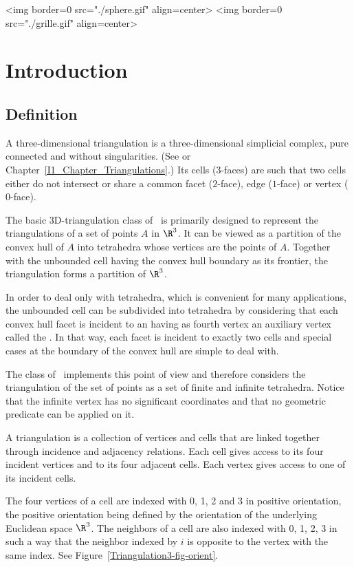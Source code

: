 \begin{ccHtmlOnly}
<img border=0 src="./sphere.gif" align=center>
<img border=0 src="./grille.gif" align=center>
\end{ccHtmlOnly}
\section{Introduction}
\label{Triangulation3-sec-intro}
\subsection{Definition}
\label{Triangulation3-sec-def}
A three-dimensional triangulation is a three-dimensional simplicial
complex, pure connected and without singularities. (See
\cite{by-ag-98} or Chapter~\ref{I1_Chapter_Triangulations}.) Its
cells ($3$-faces) are such that two cells either do not intersect or
share a common facet ($2$-face), edge ($1$-face) or vertex ($0$-face).

The basic 3D-triangulation class of \cgal\ is primarily designed to
represent the triangulations of a set of points $A$ in $\R^3$.  It can
be viewed as a partition of the convex hull of {$A$} into tetrahedra
whose vertices are the points of {$A$}.  Together with the unbounded
cell having the convex hull boundary as its frontier, the triangulation
forms a partition of $\R^3$.

In order to deal
only with tetrahedra, which is convenient for many applications, the
unbounded cell can be subdivided into tetrahedra by considering that
each convex hull facet is incident to an  having as
fourth vertex an auxiliary vertex called the .  In
that way, each facet is incident to exactly two cells and special cases
at the boundary of the convex hull are simple to deal with.

The class  of \cgal\ implements this
point of view and therefore considers the triangulation of the set
of points as a set of finite and infinite tetrahedra.  Notice that the
infinite vertex has no significant coordinates and that no
geometric predicate can be applied on it.

A triangulation is a collection of vertices and cells that are linked
together through incidence and adjacency relations. Each cell gives
access to its four incident vertices and to its four adjacent
cells. Each vertex gives access to one of its incident cells.

The four vertices of a cell are indexed with 0, 1, 2 and 3 in positive
orientation, the positive orientation being defined by the orientation
of the underlying Euclidean space $\R^3$. The neighbors of a cell are also
indexed with 0, 1, 2, 3 in such a way that the neighbor indexed by $i$
is opposite to the vertex with the same index. See
Figure~\ref{Triangulation3-fig-orient}.

